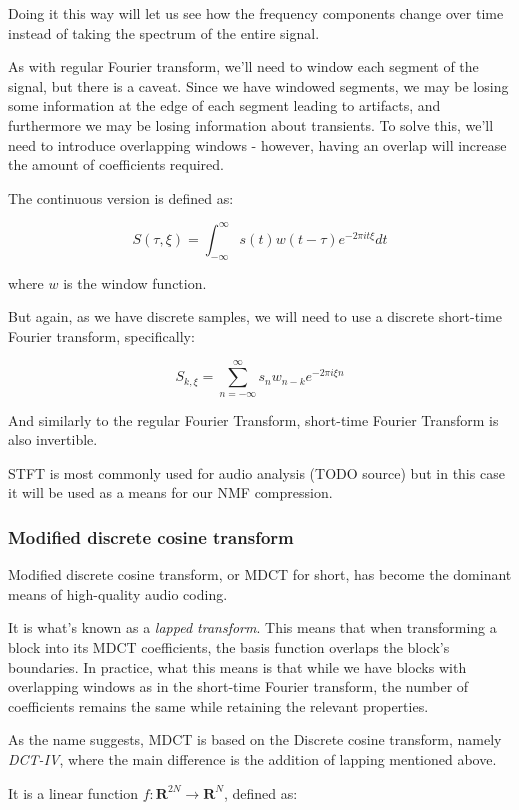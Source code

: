 Doing it this way will let us see how the frequency components change over time instead of taking the spectrum of the entire signal.

As with regular Fourier transform, we'll need to window each segment of the signal, but there is a caveat. Since we have windowed segments, we may be losing some information at the edge of each segment leading to artifacts, and furthermore we may be losing information about transients. To solve this, we'll need to introduce overlapping windows - however, having an overlap will increase the amount of coefficients required.

The continuous version is defined as: \cite{Recoskie2014ConstrainedNM}

$$S(\tau, \xi) = \int_{-\infty}^{\infty}s(t)w(t-\tau)e^{-2\pi it\xi}dt$$

where $w$ is the window function.

But again, as we have discrete samples, we will need to use a discrete short-time Fourier transform, specifically:

$$S_{k, \xi} = \sum_{n=-\infty}^{\infty}s_nw_{n-k}e^{-2\pi i\xi n}$$

And similarly to the regular Fourier Transform, short-time Fourier Transform is also invertible. \cite{selesnick_2009}

STFT is most commonly used for audio analysis (TODO source) but in this case it will be used as a means for our NMF compression.

\subsubsection{Modified discrete cosine transform}
Modified discrete cosine transform, or MDCT for short, has become the dominant means of high-quality audio coding. \cite{wang_vilermo_2012_mdct}

It is what's known as a \emph{lapped transform}. This means that when transforming a block into its MDCT coefficients, the basis function overlaps the block's boundaries. \cite{Malvar:1992:SPL:531523} In practice, what this means is that while we have blocks with overlapping windows as in the short-time Fourier transform, the number of coefficients remains the same while retaining the relevant properties.

As the name suggests, MDCT is based on the Discrete cosine transform, namely \emph{DCT-IV}, where the main difference is the addition of lapping mentioned above.

It is a linear function $f: \mathbf{R}^{2N} \rightarrow \mathbf{R}^N$, defined as: \cite{Babu2013FastAE}

